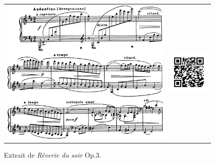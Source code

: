 \begin{figure}[!p]
  \begin{bigcenter}
    \begin{tabular}{lr}
      \includegraphics[width=12.5cm, keepaspectratio]{op3.png}
      &
      \includegraphics[width=3cm, keepaspectratio]{op3-qr.png}
    \end{tabular}
  \end{bigcenter}
  \caption{\label{op3}Extrait de \emph{Rêverie du soir} Op.3.}
\end{figure}

